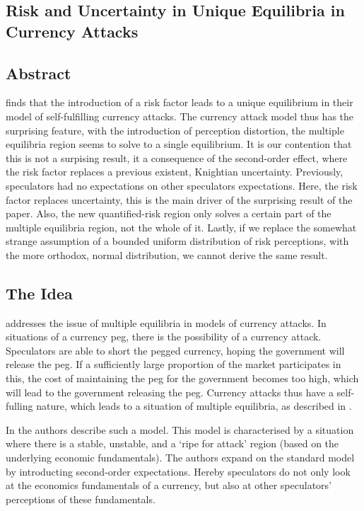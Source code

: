 \begin{refsection}
\chapter{Risk and Uncertainty in Unique Equilibria in Currency Attacks}
\label{unc}

\section*{Abstract}
\textcite{morris1998unique} finds that the introduction of a risk factor leads to a unique equilibrium in their model of self-fulfilling currency attacks. The currency attack model thus has the surprising feature, with the introduction of perception distortion, the multiple equilibria region seems to solve to a single equilibrium. It is our contention that this is not a surpising result, it a consequence of the second-order effect, where the risk factor replaces a previous existent, Knightian uncertainty. Previously, speculators had no expectations on other speculators expectations. Here, the risk factor replaces uncertainty, this is the main driver of the surprising result of the paper. Also, the new quantified-risk region only solves a certain part of the multiple equilibria region, not the whole of it. Lastly, if we replace the somewhat strange assumption of a bounded uniform distribution of risk perceptions, with the more orthodox, normal distribution, we cannot derive the same result.

\section{The Idea}
\label{unc:idea}
\textcite{morris1998unique} addresses the issue of multiple equilibria in models of currency attacks.
In situations of a currency peg, there is the possibility of a currency attack.
Speculators are able to short the pegged currency, hoping the government will release the peg.
If a sufficiently large proportion of the market participates in this,
the cost of maintaining the peg for the government becomes too high,
which will lead to the government releasing the peg.
Currency attacks thus have a self-fulling nature,
which leads to a situation of multiple equilibria,
as described in \textcite{obstfeld1986rational,obstfeld1995logic,obstfeld1996models}.

In \textcite{morris1998unique} the authors describe such a model.
This model is characterised by a situation where there is a stable, unstable,
and a `ripe for attack' region (based on the underlying economic fundamentals).
The authors expand on the standard model by introducting second-order expectations.
Hereby speculators do not only look at the economics fundamentals of a currency,
but also at other speculators' perceptions of these fundamentals.


\end{refsection}
